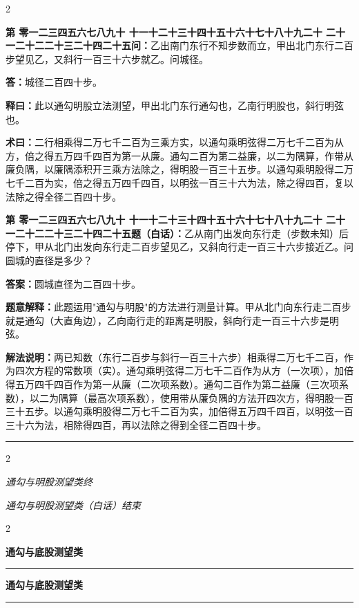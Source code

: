 \documentclass[10pt,a4paper]{article}
\newcommand{\longline}{\noindent\rule{\textwidth}{0.4pt}}
\newcounter{probnum}
\newcounter{probnumvol}[section]
\newcommand{\chnum}[1]{%
  \ifcase#1 零\or 一\or 二\or 三\or 四\or 五\or 六\or 七\or 八\or 九\or 十\or
    十一\or 十二\or 十三\or 十四\or 十五\or 十六\or 十七\or 十八\or 十九\or 二十\or
    二十一\or 二十二\or 二十三\or 二十四\or 二十五\fi}
\newcommand{\problemclassical}[1]{%
  \stepcounter{probnumvol}%
  \par\noindent
  \textcolor{classicalcolor}{\textbf{第\chnum{\value{probnumvol}}问：}}#1\par\smallskip
}
\newcommand{\problemmodern}[1]{%
  \par\noindent
  \textcolor{moderncolor}{\textbf{第\chnum{\value{probnumvol}}题（白话）：}}#1\par\smallskip
}
\newcommand{\answerclassical}[1]{%
  \par\noindent\textcolor{classicalcolor}{\textbf{答：}}#1\par
}
\newcommand{\answermodern}[1]{%
  \par\noindent\textcolor{moderncolor}{\textbf{答案：}}#1\par
}
\newcommand{\shiyiclassical}[1]{%
  \par\noindent\textcolor{classicalcolor}{\textbf{释曰：}}#1\par
}
\newcommand{\shiyimodern}[1]{%
  \par\noindent\textcolor{moderncolor}{\textbf{题意解释：}}#1\par
}
\newcommand{\shuyueclassical}[1]{%
  \par\noindent\textcolor{classicalcolor}{\textbf{术曰：}}#1\par
}
\newcommand{\shuyuemodern}[1]{%
  \par\noindent\textcolor{moderncolor}{\textbf{解法说明：}}#1\par
}
\newcommand{\volheaderclassical}[1]{%
  \begin{center}{\large\bfseries\color{volcolor} #1}\end{center}
  \vspace{0.3cm}
  \longline
  \vspace{0.3cm}
}
\newcommand{\volheadermodern}[1]{%
  \begin{center}{\large\bfseries\color{volcolor} #1}\end{center}
  \vspace{0.3cm}
  \longline
  \vspace{0.3cm}
}
\newcommand{\endclassical}[1]{%
  \vspace{0.3cm}
  \begin{center}\textit{#1}\end{center}
}
\newcommand{\endmodern}[1]{%
  \vspace{0.3cm}
  \begin{center}\textit{#1}\end{center}
}
\begin{document}
\begin{paracol}{2}

\problemclassical{乙出南门东行不知步数而立，甲出北门东行二百步望见乙，又斜行一百三十六步就乙。问城径。}

\answerclassical{城径二百四十步。}

\shiyiclassical{此以通勾明股立法测望，甲出北门东行通勾也，乙南行明股也，斜行明弦也。}

\shuyueclassical{二行相乘得二万七千二百为三乘方实，以通勾乘明弦得二万七千二百为从方，倍之得五万四千四百为第一从廉。通勾二百为第二益廉，以二为隅算，作带从廉负隅，以廉隅添积开三乘方法除之，得明股一百三十五步。以通勾乘明股得二万七千二百为实，倍之得五万四千四百，以明弦一百三十六为法，除之得四百，复以法除之得全径二百四十步。}

\switchcolumn

\problemmodern{乙从南门出发向东行走（步数未知）后停下，甲从北门出发向东行走二百步望见乙，又斜向行走一百三十六步接近乙。问圆城的直径是多少？}

\answermodern{圆城直径为二百四十步。}

\shiyimodern{此题运用"通勾与明股"的方法进行测量计算。甲从北门向东行走二百步就是通勾（大直角边），乙向南行走的距离是明股，斜向行走一百三十六步是明弦。}

\shuyuemodern{两已知数（东行二百步与斜行一百三十六步）相乘得二万七千二百，作为四次方程的常数项（实）。通勾乘明弦得二万七千二百作为从方（一次项），加倍得五万四千四百作为第一从廉（二次项系数）。通勾二百作为第二益廉（三次项系数），以二为隅算（最高次项系数），使用带从廉负隅的方法开四次方，得明股一百三十五步。以通勾乘明股得二万七千二百为实，加倍得五万四千四百，以明弦一百三十六为法，相除得四百，再以法除之得到全径二百四十步。}

\end{paracol}

\vspace{0.5cm}
\longline
\begin{paracol}{2}
\endclassical{通勾与明股测望类终}
\switchcolumn
\endmodern{通勾与明股测望类（白话）结束}
\end{paracol}

\newpage

\setcounter{probnumvol}{0}

\begin{paracol}{2}

\volheaderclassical{通勾与底股测望类}

\switchcolumn

\volheadermodern{通勾与底股测望类}

\end{paracol}
\end{document}
